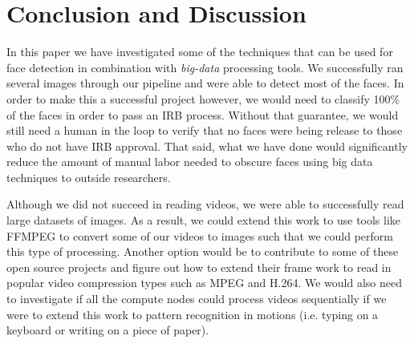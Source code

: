 \documentclass[
	submission,
	final,
	notitlepage,
	narroweqnarray,
	inline,
	twoside,
	]{ieee}
\begin{document}
\section{Conclusion and Discussion}
\PARstart In this paper we have investigated some of the techniques that can be used for face detection
in combination with \textit{big-data} processing tools. We successfully ran several images through
our pipeline and were able to detect most of the faces. In order to make this a successful project however,
we would need to classify 100\% of the faces in order to pass an IRB process. Without that guarantee,
we would still need a human in the loop to verify that no faces were being release to those who do
not have IRB approval. That said, what we have done would significantly reduce the amount of manual
labor needed to obscure faces using big data techniques to outside researchers.

Although we did not succeed in reading videos,
we were able to successfully read large datasets of images. As a result, we could extend this work
to use tools like FFMPEG to convert some of our videos to images such that we could perform this
type of processing. Another option would be to contribute to some of these open source projects
and figure out how to extend their frame work to read in popular video compression types such as
MPEG and H.264. We would also need to investigate if all the compute nodes could process videos sequentially
if we were to extend this work to pattern recognition in motions (i.e. typing on a keyboard or writing
on a piece of paper).




\end{document}
